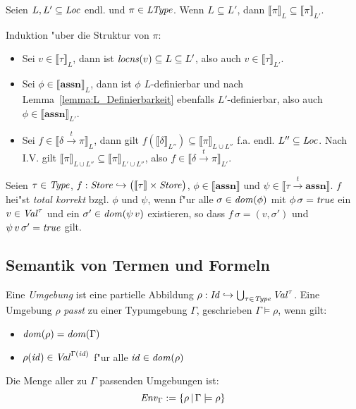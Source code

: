 \documentclass[12pt,a4paper,bigheadings]{scrartcl}
\newcommand{\semantic}[1]{\ensuremath{\llbracket#1\rrbracket}}
\newcommand{\assn}{\ensuremath{\mathbf{assn}}}
\newcommand{\locns}{\name{locns}}
\newcommand{\tto}{\ensuremath{\xrightarrow{t}}}
\begin{document}
\begin{lemma}
  Seien $L,L'\subseteq{\text{\it Loc\/}}$ endl. und $\pi\in{\text{\it LType\/}}$. Wenn $L\subseteq L'$, dann
  $\semantic{\pi}_{L} \subseteq \semantic{\pi}_{L'}$.
\end{lemma}

\begin{beweis}
  Induktion "uber die Struktur von $\pi$:
  \begin{itemize}
    \item Sei $v \in \semantic{\tau}_L$, dann ist $\locns(v)\subseteq L \subseteq L'$, also auch $v\in\semantic{\tau}_{L'}$.
    \item Sei $\phi \in \semantic{\assn}_L$, dann ist $\phi$ $L$-definierbar und nach Lemma~\ref{lemma:L_Definierbarkeit}
          ebenfalls $L'$-definierbar, also auch $\phi \in \semantic{\assn}_{L'}$.
    \item Sei $f\in\semantic{\delta \tto \pi}_L$, dann gilt $f(\semantic{\delta}_{L''}) \subseteq \semantic{\pi}_{L\cup L''}$
          f.a. endl. $L''\subseteq{\text{\it Loc\/}}$. Nach I.V. gilt $\semantic{\pi}_{L\cup L''} \subseteq \semantic{\pi}_{L'\cup L''}$,
          also $f\in\semantic{\delta \tto \pi}_{L'}$.
  \end{itemize}
\end{beweis}

\begin{definition}
  Seien $\tau\in{\text{\it Type\/}}$, $f:\Store \pto \bigl(\semantic{\tau} \times \Store\bigr)$,
  $\phi\in\semantic{\assn}$ und $\psi \in \semantic{\tau \tto \assn}$. $f$ hei"st
  {\em total korrekt} bzgl. $\phi$ und $\psi$, wenn f"ur alle $\sigma\in{\text{\it dom\/}}(\phi)$
  mit $\phi\,\sigma={\text{\it true\/}}$ ein $v\in{\text{\it Val\/}}^\tau$ und ein $\sigma'\in{\text{\it dom\/}}(\psi\,v)$
  existieren, so dass $f\,\sigma = (v,\sigma')$ und $\psi\,v\,\sigma'={\text{\it true\/}}$ gilt.
\end{definition}


\subsection{Semantik von Termen und Formeln}

Eine {\em Umgebung} ist eine partielle Abbildung $\rho:{\text{\it Id\/}}\hookrightarrow\bigcup_{\tau\in{\text{\it Type\/}}} {\text{\it Val\/}}^\tau$.
Eine Umgebung $\rho$ {\em passt} zu einer Typumgebung $\Gamma$, geschrieben $\Gamma \models \rho$,
wenn gilt:
\begin{itemize}
  \item ${\text{\it dom\/}}(\rho) = {\text{\it dom\/}}(\Gamma)$
  \item $\rho({\text{\it id\/}}) \in {\text{\it Val\/}}^{\Gamma({\text{\it id\/}})}$ f"ur alle ${\text{\it id\/}}\in{\text{\it dom\/}}(\rho)$
\end{itemize}
Die Menge aller zu $\Gamma$ passenden Umgebungen ist:
\[
  {\text{\it Env\/}}_\Gamma := \{\rho\,|\,\Gamma \models \rho\}
\]
\end{document}

